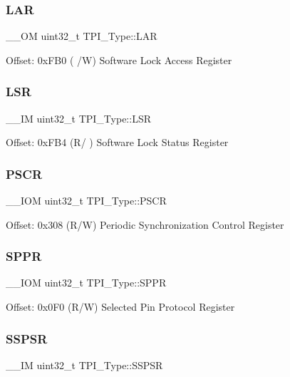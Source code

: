 \subsubsection{\texorpdfstring{LAR}{LAR}}
{\footnotesize\ttfamily \+\_\+\+\_\+\+OM uint32\+\_\+t T\+P\+I\+\_\+\+Type\+::\+L\+AR}

Offset\+: 0x\+F\+B0 ( /W) Software Lock Access Register \mbox{\label{struct_t_p_i___type_af5373794b1c024b28a2a59a9eab6498e}} 
\subsubsection{\texorpdfstring{LSR}{LSR}}
{\footnotesize\ttfamily \+\_\+\+\_\+\+IM uint32\+\_\+t T\+P\+I\+\_\+\+Type\+::\+L\+SR}

Offset\+: 0x\+F\+B4 (R/ ) Software Lock Status Register \mbox{\label{struct_t_p_i___type_ad092e61fccb6752d3f4adbbd4a7e1567}} 
\subsubsection{\texorpdfstring{PSCR}{PSCR}}
{\footnotesize\ttfamily \+\_\+\+\_\+\+I\+OM uint32\+\_\+t T\+P\+I\+\_\+\+Type\+::\+P\+S\+CR}

Offset\+: 0x308 (R/W) Periodic Synchronization Control Register \mbox{\label{struct_t_p_i___type_a12f79d4e3ddc69893ba8bff890d04cc5}} 
\subsubsection{\texorpdfstring{SPPR}{SPPR}}
{\footnotesize\ttfamily \+\_\+\+\_\+\+I\+OM uint32\+\_\+t T\+P\+I\+\_\+\+Type\+::\+S\+P\+PR}

Offset\+: 0x0\+F0 (R/W) Selected Pin Protocol Register \mbox{\label{struct_t_p_i___type_a037901d7cb870199ac51d9ad0ef9fd1a}} 
\subsubsection{\texorpdfstring{SSPSR}{SSPSR}}
{\footnotesize\ttfamily \+\_\+\+\_\+\+IM uint32\+\_\+t T\+P\+I\+\_\+\+Type\+::\+S\+S\+P\+SR}

